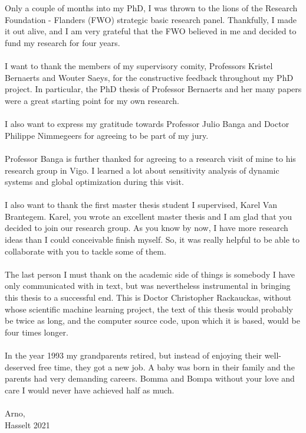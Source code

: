 \\
\\
Only a couple of months into my PhD, I was thrown to the lions of the Research Foundation - Flanders (FWO) strategic basic research panel. Thankfully, I made it out alive, and I am very grateful that the FWO believed in me and decided to fund my research for four years. 
\\
\\
I want to thank the members of my supervisory comity, Professors Kristel Bernaerts and Wouter Saeys, for the constructive feedback throughout my PhD project. In particular, the PhD thesis of Professor Bernaerts and her many papers were a great starting point for my own research.
\\
\\
I also want to express my gratitude towards Professor Julio Banga and Doctor Philippe Nimmegeers for agreeing to be part of my jury.
\\
\\
Professor Banga is further thanked for agreeing to a research visit of mine to his research group in Vigo. I learned a lot about sensitivity analysis of dynamic systems and global optimization during this visit.
\\
\\
I also want to thank the first master thesis student I supervised, Karel Van Brantegem. Karel, you wrote an excellent master thesis and I am glad that you decided to join our research group. As you know by now, I have more research ideas than I could conceivable finish myself. So, it was really helpful to be able to collaborate with you to tackle some of them.
\\
\\
The last person I must thank on the academic side of things is somebody I have only communicated with in text, but was nevertheless instrumental in bringing this thesis to a successful end. This is Doctor Christopher Rackauckas, without whose scientific machine learning project, the text of this thesis would probably be twice as long, and the computer source code, upon which it is based, would be four times longer.
\\
\\
In the year 1993 my grandparents retired, but instead of enjoying their well-deserved free time, they got a new job. A baby was born in their family and the parents had very demanding careers. Bomma and Bompa without your love and care I would never have achieved half as much.
\\
\\
Arno,
\\
Hasselt 2021

